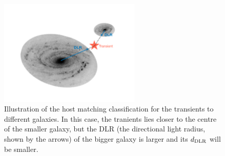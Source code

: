 \begin{figure}
\centering
\includegraphics[width=0.6\textwidth]{./chapters/chapter3/Figures/dlr.pdf}
\caption{Illustration of the host matching classification for the transients to different galaxies. In this case, the tranients lies closer to the centre of the smaller galaxy, but the DLR (the directional light radius, shown by the arrows) of the bigger galaxy is larger and its $d_{\rm DLR}$ will be smaller.}\label{fig:DLR}\end{figure}

